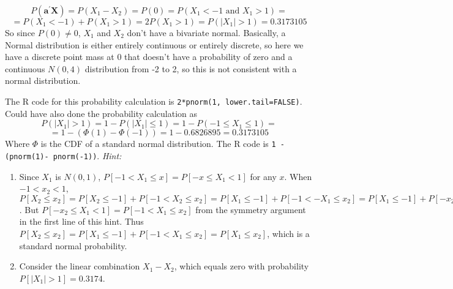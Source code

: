 \begin{enumerate}[label= (\alph*)]
    \[
      P(
        \textbf{a}^{\prime}
        \textbf{X}
      )
      =
      P(X_1 - X_2)
      =
      P(0)
      =
      P(X_1 < -1 \text{ and } X_1 > 1)
      =
    \]
    \[
      =
      P(X_1 < -1) + P(X_1 > 1)
      =
      2P(X_1 > 1)
      =
      P(|X_1| > 1)
      =
      0.3173105
    \]
    So since $P(0) \ne 0$, $X_1$ and $X_2$ don't have a bivariate normal. Basically, a Normal distribution is either entirely continuous or entirely discrete, so here we have a discrete point mass at 0 that doesn't have a probability of zero and a continuous $N(0,4)$ distribution from -2 to 2, so this is not consistent with a normal distribution.
    \par The R code for this probability calculation is \texttt{2*pnorm(1, lower.tail=FALSE)}. Could have also done the probability calculation as
    \[
      P(|X_1| > 1)
      =
      1 - P(|X_1| \leq 1)
      =
      1 - P(-1 \leq X_1 \leq 1)
      =
    \]
    \[
      =
      1 - \left( \Phi (1) - \Phi (-1) \right)
      =
      1 - 0.6826895
      =0.3173105
    \]
    Where $\Phi$ is the CDF of a standard normal distribution. The R code is \texttt{1 - (pnorm(1)- pnorm(-1))}.
    \newline
    \textit{Hint:}
    \begin{enumerate}[label= (\alph*)]
        \item Since $X_1$ is $N(0,1)$, $P[-1 < X_1 \leq x] = P[-x \leq X_1 < 1]$ for any $x$. When $-1 < x_2 < 1$, $P[X_2 \leq x_2] = P[X_2 \leq -1] + P[-1 < X_2 \leq x_2] = P[X_1 \leq -1] + P[-1 < -X_1 \leq x_2] = P[X_1 \leq -1] + P[-x_2 \leq X_1 < 1]$. But $P[-x_2 \leq X_1 < 1] = P[-1 < X_1 \leq x_2]$ from the symmetry argument in the first line of this hint. Thus $P[X_2 \leq x_2] = P[X_1 \leq -1] + P[-1 < X_1 \leq x_2] = P[X_1 \leq x_2]$, which is a standard normal probability.
        \item Consider the linear combination $X_1 - X_2$, which equals zero with probability $P[|X_1| > 1] = 0.3174$.
    \end{enumerate}
\end{enumerate}
